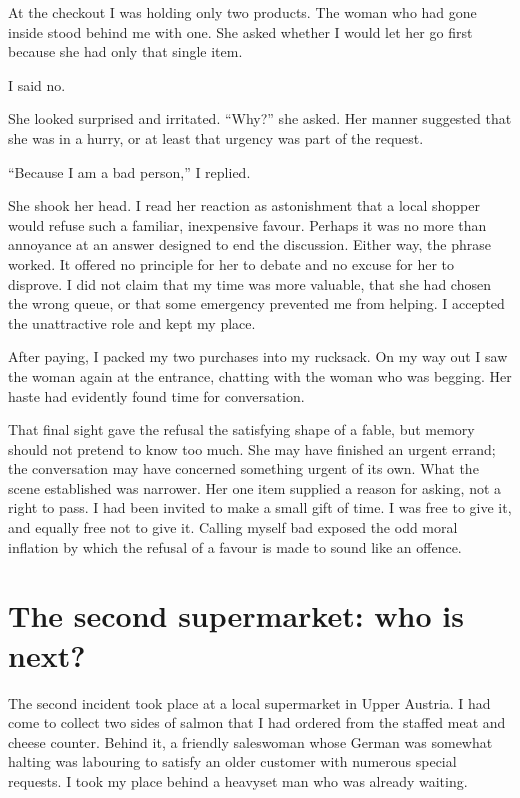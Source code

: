 ﻿\documentclass[12pt,a4paper]{book}
\begin{document}
At the checkout I was holding only two products.  The woman who had gone inside
stood behind me with one.  She asked whether I would let her go first because
she had only that single item.

I said no.

She looked surprised and irritated.  ``Why?'' she asked.  Her manner suggested
that she was in a hurry, or at least that urgency was part of the request.

``Because I am a bad person,'' I replied.

She shook her head.  I read her reaction as astonishment that a local shopper
would refuse such a familiar, inexpensive favour.  Perhaps it was no more than
annoyance at an answer designed to end the discussion.  Either way, the phrase
worked.  It offered no principle for her to debate and no excuse for her to
disprove.  I did not claim that my time was more valuable, that she had chosen
the wrong queue, or that some emergency prevented me from helping.  I accepted
the unattractive role and kept my place.

After paying, I packed my two purchases into my rucksack.  On my way out I saw
the woman again at the entrance, chatting with the woman who was begging.  Her
haste had evidently found time for conversation.

That final sight gave the refusal the satisfying shape of a fable, but memory
should not pretend to know too much.  She may have finished an urgent errand;
the conversation may have concerned something urgent of its own.  What the
scene established was narrower.  Her one item supplied a reason for asking,
not a right to pass.  I had been invited to make a small gift of time.  I was
free to give it, and equally free not to give it.  Calling myself bad exposed
the odd moral inflation by which the refusal of a favour is made to sound like
an offence.

\section{The second supermarket: who is next?}

The second incident took place at a local supermarket in Upper Austria.  I had
come to collect two sides of salmon that I had ordered from the staffed meat
and cheese counter.  Behind it, a friendly saleswoman whose German was somewhat
halting was labouring to satisfy an older customer with numerous special
requests.  I took my place behind a heavyset man who was already waiting.
\end{document}
